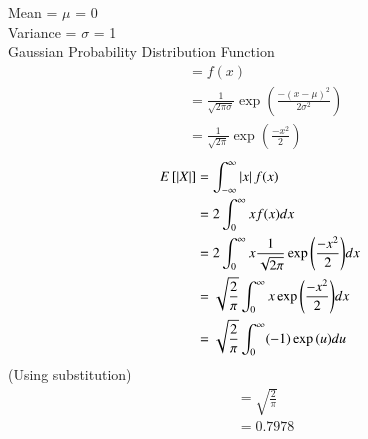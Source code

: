 Mean = $\mu$ = 0\\
Variance = $\sigma$ = 1\\
Gaussian Probability Distribution Function
\begin{align}
    &= f(x)\\
    &= \frac{1}{\sqrt{2\pi\sigma}} \exp{\left(\frac{-(x - \mu)^2}{2\sigma^2}\right)}\\
    &= \frac{1}{\sqrt{2\pi}} \exp{ \left(\frac{-x^2}{2}\right)}
\end{align}
\begin{align}
    E\left[  \left\vert X\right\vert \right] &= \int _{-\infty} ^{\infty} \left\vert x\right\vert f(x)\\
    &= 2 \int _{0} ^{\infty} x f(x) dx \\
    &= 2 \int _{0} ^{\infty} x \frac{1}{\sqrt{2\pi}}  \exp{\left(\frac{-x^2}{2}\right)} dx\\
    &= \sqrt{\frac{2}{\pi}} \int _{0} ^{\infty} x  \exp {\left(\frac{-x^2}{2}\right)} dx\\
    &= \sqrt{\frac{2}{\pi}} \int _{0} ^{\infty} (-1) \exp{(u)} du
\end{align}
(Using substitution)\\
\begin{align}
    &= \sqrt{\frac{2}{\pi}}\\
    &= 0.7978
\end{align}